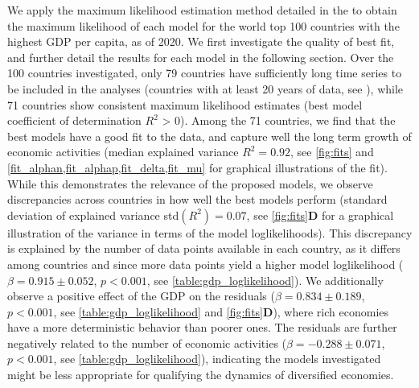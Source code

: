 We apply the maximum likelihood estimation method detailed in the  to obtain the maximum likelihood of each model for the world top 100 countries with the highest GDP per capita, as of 2020. We first investigate the quality of best fit, and further detail the results for each model in the following section. %
% 
Over the 100 countries investigated, only 79 countries have sufficiently long time series to be included in the analyses (countries with at least 20 years of data, see ), while 71 countries show consistent maximum likelihood estimates (best model coefficient of determination $R^2$ > 0).
% 
Among the 71 countries, we find that the best models have a good fit to the data, and capture well the long term growth of economic activities (median explained variance $R^2 = 0.92$, see \cref{fig:fits} and \cref{fit_alphan,fit_alphap,fit_delta,fit_mu} for graphical illustrations of the fit).
% 
While this demonstrates the relevance of the proposed models, we observe discrepancies across countries in how well the best models perform (standard deviation of explained variance std$(R^2)= 0.07$, see \cref{fig:fits}\textbf{D} for a graphical illustration of the variance in terms of the model loglikelihoods).
% 
% 
This discrepancy is explained by the number of data points available in each country, as it differs among countries and since more data points yield a higher model loglikelihood ($\beta = 0.915 \pm 0.052$, $p<0.001$, see \cref{table:gdp_loglikelihood}).
% 
We additionally observe a positive effect of the GDP on the residuals ($\beta = 0.834 \pm 0.189$, $p<0.001$, see \cref{table:gdp_loglikelihood} and \cref{fig:fits}\textbf{D}), where rich economies have a more deterministic behavior than poorer ones. The residuals are further negatively related to the number of economic activities ($\beta = -0.288 \pm 0.071$, $p<0.001$, see \cref{table:gdp_loglikelihood}), indicating the models investigated might be less appropriate for qualifying the dynamics of diversified economies.
% 
% 

